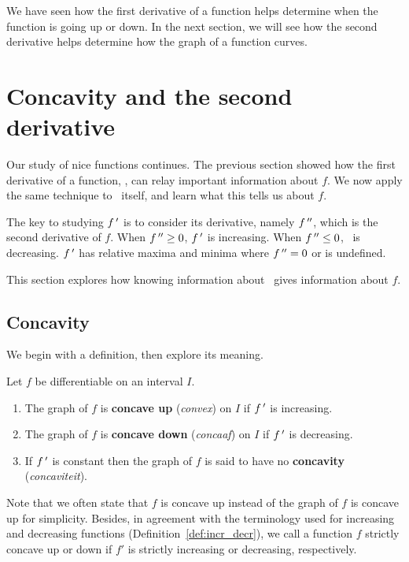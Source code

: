 We have seen how the first derivative of a function helps determine when the function is going up or down. In the next section, we will see how the second derivative helps determine how the graph of a function curves.

\section{Concavity and the second derivative}\label{sec:concavity}

Our study of nice functions continues. The previous section showed how the first derivative of a function, \fp, can relay important information about $f$. We now apply the same technique to \fp\ itself, and learn what this tells us about $f$.

The key to studying $f\,'$ is to consider its derivative, namely  $f\,''$, which is the second derivative of $f$.  When $f\,''\geq0$, $f\,'$ is increasing. When $f\,''\leq0$, \fp\ is decreasing.  $f\,'$ has relative maxima and minima where $f\,''=0$ or is undefined.

This section explores how knowing information about \fpp\ gives information about $f$.

\subsection{Concavity}

We begin with a definition, then explore its meaning.

\begin{definition}\label{def:concavity}
Let $f$ be differentiable on an interval $I$. 
\begin{enumerate}
    \item The graph of $f$ is \textbf{concave up} (\textit{convex}) on $I$ if $f\,'$ is increasing. 
    \item The graph of $f$ is \textbf{concave down} (\textit{concaaf}) on $I$ if $f\,'$ is decreasing. 
    \item If $f\,'$ is constant then the graph of $f$ is said to have no \textbf{concavity} (\textit{concaviteit}).
    \end{enumerate}
\end{definition}

Note that we often state that $f$ is concave up instead of the graph of $f$ is concave up for simplicity. Besides, in agreement with the terminology used for increasing and decreasing functions (Definition~\ref{def:incr_decr}), we call a function $f$ strictly concave up or down if $f'$ is strictly increasing or decreasing, respectively. 

